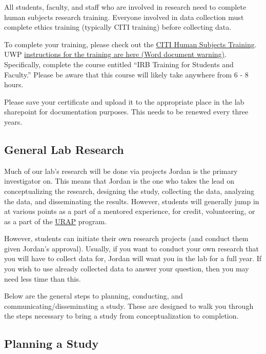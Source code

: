 \documentclass[
]{book}
\begin{document}
All students, faculty, and staff who are involved in research need to complete human subjects research training. Everyone involved in data collection must complete ethics training (typically CITI training) before collecting data.

To complete your training, please check out the \href{https://about.citiprogram.org/en/homepage/}{CITI Human Subjects Training}. UWP \href{https://www.uwp.edu/explore/offices/researchadmin/upload/CITI-tutorial.docx}{instructions for the training are here (Word document warning)}. Specifically, complete the course entitled ``IRB Training for Students and Faculty.'' Please be aware that this course will likely take anywhere from 6 - 8 hours.

Please save your certificate and upload it to the appropriate place in the lab sharepoint for documentation purposes. This needs to be renewed every three years.

\hypertarget{general-lab-research}{%
\subsection{General Lab Research}\label{general-lab-research}}

Much of our lab's research will be done via projects Jordan is the primary investigator on. This means that Jordan is the one who takes the lead on conceptualizing the research, designing the study, collecting the data, analyzing the data, and disseminating the results. However, students will generally jump in at various points as a part of a mentored experience, for credit, volunteering, or as a part of the \protect\hyperlink{URAP}{URAP} program.

However, students can initiate their own research projects (and conduct them given Jordan's approval). Usually, if you want to conduct your own research that you will have to collect data for, Jordan will want you in the lab for a full year. If you wish to use already collected data to answer your question, then you may need less time than this.

Below are the general steps to planning, conducting, and communicating/disseminating a study. These are designed to walk you through the steps necessary to bring a study from conceptualization to completion.

\hypertarget{planning-a-study}{%
\subsection{Planning a Study}\label{planning-a-study}}
\end{document}
